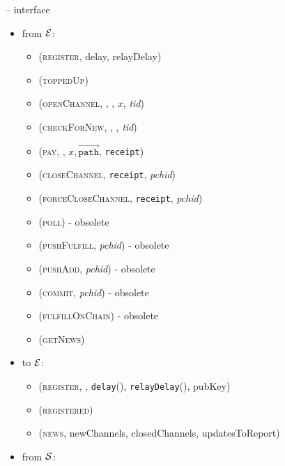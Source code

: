 \label{appendix:payfunc}
\begin{figure}[H]
  \begin{systembox}{\fpaynet{} -- interface}
    \begin{itemize}
      \item from $\mathcal{E}$:
      \begin{itemize}
        \item (\textsc{register}, delay, relayDelay)
        \item (\textsc{toppedUp})
        \item (\textsc{openChannel}, \alice, \bob, $x$, \textit{tid})
        \item (\textsc{checkForNew}, \alice, \bob, \textit{tid})
        \item (\textsc{pay}, \bob, $x, \overrightarrow{\mathtt{path}}$,
        \texttt{receipt})
        \item (\textsc{closeChannel}, \texttt{receipt}, \textit{pchid})
        \item (\textsc{forceCloseChannel}, \texttt{receipt}, \textit{pchid})
        \item (\textsc{poll}) {\color{blue} - obsolete}
        \item (\textsc{pushFulfill}, \textit{pchid}) {\color{blue} - obsolete}
        \item (\textsc{pushAdd}, \textit{pchid}) {\color{blue} - obsolete}
        \item (\textsc{commit}, \textit{pchid}) {\color{blue} - obsolete}
        \item (\textsc{fulfillOnChain}) {\color{blue} - obsolete}
        \item (\textsc{getNews})
      \end{itemize}
      \item to $\mathcal{E}$:
      \begin{itemize}
        \item (\textsc{register}, \alice, \texttt{delay}(\alice),
        \texttt{relayDelay}(\alice), pubKey)
        \item (\textsc{registered})
        \item (\textsc{news}, newChannels, closedChannels, updatesToReport)
      \end{itemize}
      \item from $\mathcal{S}$:
\end{itemize}
\end{systembox}
\end{figure}
